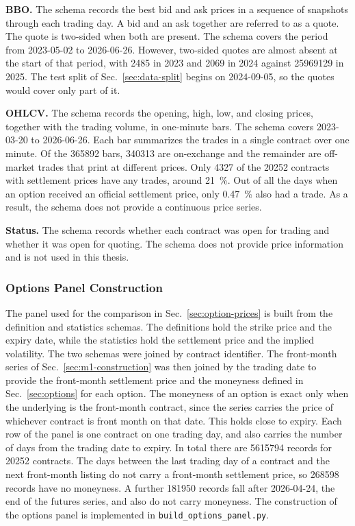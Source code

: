 \textbf{BBO.} The schema records the best bid and ask prices in a sequence of snapshots through each trading day. A bid and an ask together are referred to as a quote. The quote is two-sided when both are present. The schema covers the period from 2023-05-02 to 2026-06-26. However, two-sided quotes are almost absent at the start of that period, with \num{2485} in 2023 and \num{2069} in 2024 against \num{25969129} in 2025. The test split of Sec.~\ref{sec:data-split} begins on 2024-09-05, so the quotes would cover only part of it.

\textbf{OHLCV.} The schema records the opening, high, low, and closing prices, together with the trading volume, in one-minute bars. The schema covers 2023-03-20 to 2026-06-26. Each bar summarizes the trades in a single contract over one minute. Of the \num{365892} bars, \num{340313} are on-exchange and the remainder are off-market trades that print at different prices. Only \num{4327} of the \num{20252} contracts with settlement prices have any trades, around \SI{21}{\percent}. Out of all the days when an option received an official settlement price, only \SI{0.47}{\percent} also had a trade. As a result, the schema does not provide a continuous price series.

\textbf{Status.} The schema records whether each contract was open for trading and whether it was open for quoting. The schema does not provide price information and is not used in this thesis.

\subsubsection{Options Panel Construction}\label{sec:options-panel}
The panel used for the comparison in Sec.~\ref{sec:option-prices} is built from the definition and statistics schemas. The definitions hold the strike price and the expiry date, while the statistics hold the settlement price and the implied volatility. The two schemas were joined by contract identifier. The front-month series of Sec.~\ref{sec:m1-construction} was then joined by the trading date to provide the front-month settlement price and the moneyness defined in Sec.~\ref{sec:options} for each option. The moneyness of an option is exact only when the underlying is the front-month contract, since the series carries the price of whichever contract is front month on that date. This holds close to expiry. Each row of the panel is one contract on one trading day, and also carries the number of days from the trading date to expiry. In total there are \num{5615794} records for \num{20252} contracts. The days between the last trading day of a contract and the next front-month listing do not carry a front-month settlement price, so \num{268598} records have no moneyness. A further \num{181950} records fall after 2026-04-24, the end of the futures series, and also do not carry moneyness. The construction of the options panel is implemented in \texttt{build\_options\_panel.py}.

